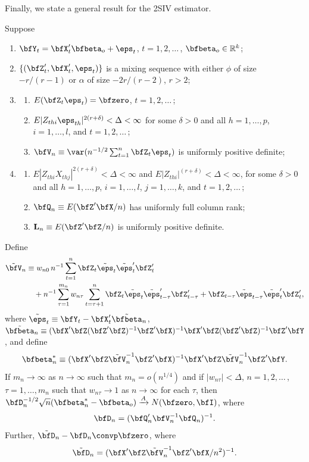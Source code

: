 Finally, we state a general result for the 2SIV estimator.

\begin{corollary}\label{cor:6.24}
Suppose
\begin{enumerate}[label=(\roman*)]
  \item $\bfY_t = \bfX_t'\bfbeta_o + \eps_t$, \quad $t = 1,2,\ldots$\,, \quad $\bfbeta_o \in \mathbb{R}^k$;
  \item $\{(\bfZ_t',\bfX_t',\eps_t)\}$ is a mixing sequence with either $\phi$ of size $-r/(r-1)$ or $\alpha$ of size $-2r/(r-2)$, $r > 2$;
  \item\begin{enumerate}[label=(\alph*)]
    \item $E(\bfZ_t\eps_t) = \bfzero$, \quad $t = 1,2,\ldots$\,;
    \item $E|Z_{thi}\eps_{th}|^{2(r+\delta)} < \Delta < \infty$ for some $\delta > 0$ and all $h = 1,\ldots,p$, $i = 1,\ldots,l$, and $t = 1,2,\ldots$\,;
    \item $\bfV_n \equiv \var(n^{-1/2}\sum_{t=1}^{n}\bfZ_t\eps_t)$ is uniformly positive definite;
  \end{enumerate}
  \item\begin{enumerate}[label=(\alph*)]
    \item $E|Z_{thi}X_{thj}|^{2(r+\delta)} < \Delta < \infty$ and $E|Z_{thi}|^{(r+\delta)} < \Delta < \infty$, for some $\delta > 0$ and all $h = 1,\ldots,p$, $i = 1,\ldots,l$, $j = 1,\ldots,k$, and $t = 1,2,\ldots$\,;
    \item $\bfQ_n \equiv E(\bfZ'\bfX/n)$ has uniformly full column rank;
    \item $\mathbf{L}_n \equiv E(\bfZ'\bfZ/n)$ is uniformly positive definite.
  \end{enumerate}
\end{enumerate}
Define
\begin{align*}
  \tilde{\bfV}_n &\equiv w_{n0}\, n^{-1}\sum_{t=1}^{n}\bfZ_t\tilde{\eps}_t\tilde{\eps}_t'\bfZ_t' \\
    &\quad + n^{-1}\sum_{\tau=1}^{m_n}w_{n\tau}\sum_{t=\tau+1}^{n}\bfZ_t\tilde{\eps}_t\tilde{\eps}_{t-\tau}'\bfZ_{t-\tau}' + \bfZ_{t-\tau}\tilde{\eps}_{t-\tau}\tilde{\eps}_t'\bfZ_t',
\end{align*}
where $\tilde{\eps}_t \equiv \bfY_t - \bfX_t'\tilde{\bfbeta}_n$, $\tilde{\bfbeta}_n \equiv (\bfX'\bfZ(\bfZ'\bfZ)^{-1}\bfZ'\bfX)^{-1}\bfX'\bfZ(\bfZ'\bfZ)^{-1}\bfZ'\bfY$, and define
\[
  \bfbeta_n^* \equiv (\bfX'\bfZ\tilde{\bfV}_n^{-1}\bfZ'\bfX)^{-1}\bfX'\bfZ\tilde{\bfV}_n^{-1}\bfZ'\bfY.
\]
If $m_n \to \infty$ as $n \to \infty$ such that $m_n = o(n^{1/4})$ and if $|w_{n\tau}| < \Delta$, $n = 1,2,\ldots$\,, $\tau = 1,\ldots,m_n$ such that $w_{n\tau} \to 1$ as $n \to \infty$ for each $\tau$, then
$\bfD_n^{-1/2}\sqrt{n}(\bfbeta_n^* - \bfbeta_o) \xrightarrow{A} N(\bfzero,\bfI)$, where
\[
  \bfD_n = (\bfQ_n'\bfV_n^{-1}\bfQ_n)^{-1}.
\]
Further, $\tilde{\bfD}_n - \bfD_n \convp \bfzero$, where
\[
  \tilde{\bfD}_n = (\bfX'\bfZ\tilde{\bfV}_n^{-1}\bfZ'\bfX/n^2)^{-1}.
\]
\end{corollary}

